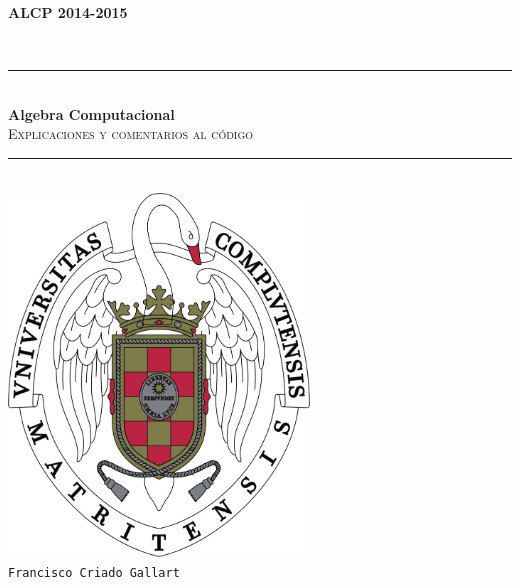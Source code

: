 \begin{titlepage}
  \begin{center}

  \begin{minipage}{0.6\linewidth}
    \vspace*{0.35in}
    \hspace*{0.4in}
    \textsc{\textbf{\large ALCP 2014-2015}}
  \end{minipage}\\[1.6cm]

    \rule{0.8\linewidth}{0.5mm} \\[0.6cm]
    {\huge \bfseries Algebra Computacional}
    \\[0.3cm] \textsc{\large Explicaciones y comentarios al código} 


    \rule{0.8\linewidth}{0.5mm} \\[1cm]
    
    \includegraphics[width=0.6\textwidth]{./escudo.png}
    ~\\[2cm]
    \texttt{\large Francisco Criado Gallart}
  \end{center}

\end{titlepage}

